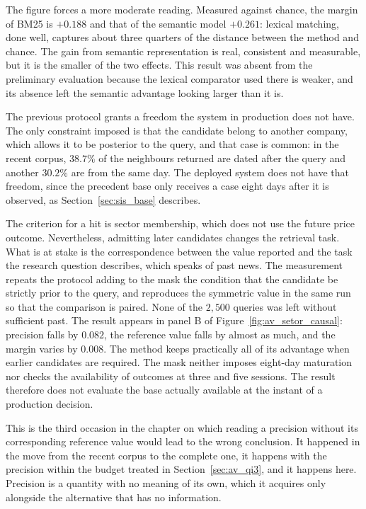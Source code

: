 The figure forces a more moderate reading. Measured against chance, the margin of BM25 is $+0.188$
and that of the semantic model $+0.261$: lexical matching, done well, captures about three quarters
of the distance between the method and chance. The gain from semantic representation is real,
consistent and measurable, but it is the smaller of the two effects. This result was absent from the
preliminary evaluation because the lexical comparator used there is weaker, and its absence left the
semantic advantage looking larger than it is.

The previous protocol grants a freedom the system in production does not have. The only constraint
imposed is that the candidate belong to another company, which allows it to be posterior to the
query, and that case is common: in the recent corpus, $38.7\%$ of the neighbours returned are dated
after the query and another $30.2\%$ are from the same day. The deployed system does not have that
freedom, since the precedent base only receives a case eight days after it is observed, as
Section~\ref{sec:sis_base} describes.

The criterion for a hit is sector membership, which does not use the future price outcome.
Nevertheless, admitting later candidates changes the retrieval task. What is at stake is the
correspondence between the value reported and the
task the research question describes, which speaks of past news. The measurement repeats the
protocol adding to the mask the condition that the candidate be strictly prior to the query, and
reproduces the symmetric value in the same run so that the comparison is paired. None of the
$2{,}500$ queries was left without sufficient past. The result appears in panel B of
Figure~\ref{fig:av_setor_causal}: precision falls by $0.082$, the reference value falls by almost
as much, and the margin varies by $0.008$. The method keeps practically all of its advantage when
earlier candidates are required. The mask neither imposes eight-day maturation nor checks the
availability of outcomes at three and five sessions. The result therefore does not evaluate
the base actually available at the instant of a production decision.

This is the third occasion in the chapter on which reading a precision without its corresponding
reference value would lead to the wrong conclusion. It happened in the move from the recent corpus
to the complete one, it happens with the precision within the budget treated in
Section~\ref{sec:av_qi3}, and it happens here. Precision is a quantity with no meaning of its own,
which it acquires only alongside the alternative that has no information.

